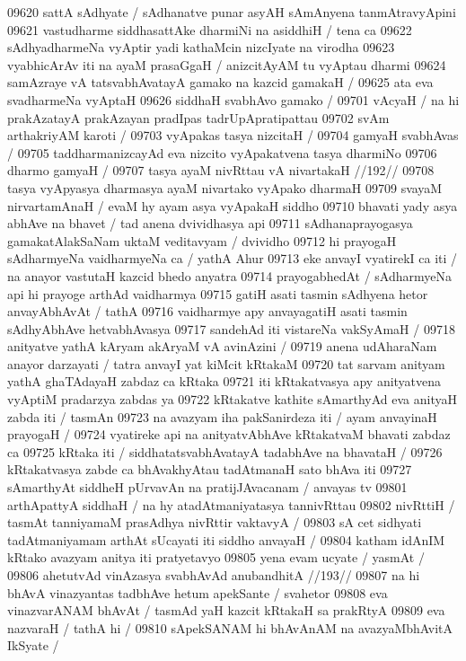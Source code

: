 09620 sattA sAdhyate / sAdhanatve punar asyAH sAmAnyena tanmAtravyApini
09621 vastudharme siddhasattAke dharmiNi na asiddhiH / tena ca
09622 sAdhyadharmeNa vyAptir yadi kathaMcin nizcIyate na virodha  
09623 vyabhicArAv iti na ayaM prasaGgaH / anizcitAyAM tu vyAptau dharmi
09624 samAzraye vA tatsvabhAvatayA gamako na kazcid gamakaH /  
09625 ata eva svadharmeNa vyAptaH
09626 	siddhaH svabhAvo gamako /
09701 vAcyaH / na hi prakAzatayA prakAzayan pradIpas tadrUpApratipattau
09702 svAm arthakriyAM karoti /  
09703 	vyApakas tasya nizcitaH / 
09704 	gamyaH svabhAvas / 
09705 taddharmanizcayAd eva nizcito vyApakatvena tasya dharmiNo 
09706 dharmo gamyaH /  
09707 	tasya ayaM nivRttau vA nivartakaH //192//
09708 tasya vyApyasya dharmasya ayaM nivartako vyApako dharmaH 
09709 svayaM nirvartamAnaH / evaM hy ayam asya vyApakaH siddho 
09710 bhavati yady asya abhAve na bhavet / tad anena dvividhasya api  
09711 sAdhanaprayogasya gamakatAlakSaNam uktaM veditavyam / dvividho  
09712 hi prayogaH sAdharmyeNa vaidharmyeNa ca / yathA Ahur 
09713 eke anvayI vyatirekI ca iti / na anayor vastutaH kazcid bhedo anyatra
09714 prayogabhedAt / sAdharmyeNa api hi prayoge arthAd vaidharmya
09715 gatiH asati tasmin sAdhyena hetor anvayAbhAvAt / tathA  
09716 vaidharmye apy anvayagatiH asati tasmin sAdhyAbhAve hetvabhAvasya  
09717 sandehAd iti vistareNa vakSyAmaH /  
09718 	anityatve yathA kAryam akAryaM vA avinAzini / 
09719 anena udAharaNam anayor darzayati / tatra anvayI yat kiMcit kRtakaM  
09720 tat sarvam anityam yathA ghaTAdayaH zabdaz ca kRtaka
09721 iti kRtakatvasya apy anityatvena vyAptiM pradarzya zabdas ya 
09722 kRtakatve kathite sAmarthyAd eva anityaH zabda iti / tasmAn
09723 na avazyam iha pakSanirdeza iti / ayam anvayinaH prayogaH /  
09724 vyatireke api na anityatvAbhAve kRtakatvaM bhavati zabdaz ca  
09725 kRtaka iti / siddhatatsvabhAvatayA tadabhAve na bhavataH / 
09726 kRtakatvasya zabde ca bhAvakhyAtau tadAtmanaH sato bhAva iti
09727 sAmarthyAt siddheH pUrvavAn na pratijJAvacanam / anvayas tv
09801 arthApattyA siddhaH / na hy atadAtmaniyatasya tannivRttau
09802 nivRttiH / tasmAt tanniyamaM prasAdhya nivRttir vaktavyA /
09803 sA cet sidhyati tadAtmaniyamam arthAt sUcayati iti siddho anvayaH /  
09804 katham idAnIM kRtako avazyam anitya iti pratyetavyo
09805 yena evam ucyate / yasmAt / 
09806 	ahetutvAd vinAzasya svabhAvAd anubandhitA //193//
09807 na hi bhAvA vinazyantas tadbhAve hetum apekSante / svahetor 
09808 eva vinazvarANAM bhAvAt / tasmAd yaH kazcit kRtakaH sa prakRtyA  
09809 eva nazvaraH / tathA hi /
09810 	sApekSANAM hi bhAvAnAM na avazyaMbhAvitA IkSyate /
